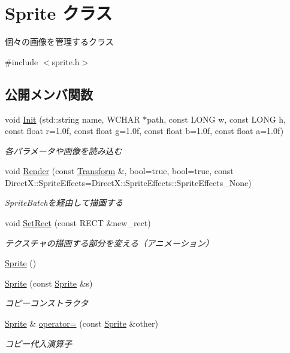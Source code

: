 \hypertarget{class_sprite}{}\section{Sprite クラス}
\label{class_sprite}


個々の画像を管理するクラス  




{\ttfamily \#include $<$sprite.\+h$>$}

\subsection*{公開メンバ関数}
\begin{DoxyCompactItemize}
\item 
void \mbox{\hyperlink{class_sprite_a86796a03be222a502397aa53a5207522}{Init}} (std\+::string name, W\+C\+H\+AR $\ast$path, const L\+O\+NG w, const L\+O\+NG h, const float r=1.\+0f, const float g=1.\+0f, const float b=1.\+0f, const float a=1.\+0f)
\begin{DoxyCompactList}\small\item\em 各パラメータや画像を読み込む \end{DoxyCompactList}\item 
void \mbox{\hyperlink{class_sprite_ac5efaa5f750f8095c8846e2183c4d52b}{Render}} (const \mbox{\hyperlink{class_transform}{Transform}} \&, bool=true, bool=true, const Direct\+X\+::\+Sprite\+Effects=Direct\+X\+::\+Sprite\+Effects\+::\+Sprite\+Effects\+\_\+\+None)
\begin{DoxyCompactList}\small\item\em Sprite\+Batchを経由して描画する \end{DoxyCompactList}\item 
void \mbox{\hyperlink{class_sprite_a0565013aa0e194c67dfbaf243ab9250a}{Set\+Rect}} (const R\+E\+CT \&new\+\_\+rect)
\begin{DoxyCompactList}\small\item\em テクスチャの描画する部分を変える（アニメーション） \end{DoxyCompactList}\item 
\mbox{\hyperlink{class_sprite_a12cba3ac1868418add3c4d95ce87e615}{Sprite}} ()
\item 
\mbox{\hyperlink{class_sprite_a53252d3d5fbc5438ed6bbd8b3913c3b4}{Sprite}} (const \mbox{\hyperlink{class_sprite}{Sprite}} \&s)
\begin{DoxyCompactList}\small\item\em コピーコンストラクタ \end{DoxyCompactList}\item 
\mbox{\hyperlink{class_sprite}{Sprite}} \& \mbox{\hyperlink{class_sprite_a3a53b4a3491e8d1e8c63387167dc7329}{operator=}} (const \mbox{\hyperlink{class_sprite}{Sprite}} \&other)
\begin{DoxyCompactList}\small\item\em コピー代入演算子 \end{DoxyCompactList}\end{DoxyCompactItemize}


